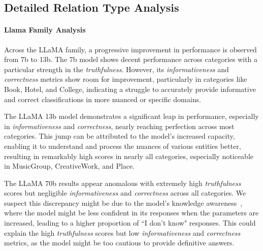 \subsection{Detailed Relation Type Analysis}
\label{app:relation_type_study}



\paragraph{Llama Family Analysis}
Across the LLaMA family, a progressive improvement in performance is observed from  7b to 13b. The 7b model shows decent performance across categories with a particular strength in the \textit{truthfulness}. However, its \textit{informativeness} and \textit{correctness} metrics show room for improvement, particularly in categories like Book, Hotel, and College, indicating a struggle to accurately provide informative and correct classifications in more nuanced or specific domains.

The LLaMA 13b model demonstrates a significant leap in performance, especially in \textit{informativeness} and \textit{correctness}, nearly reaching perfection across most categories. This jump can be attributed to the model's increased capacity, enabling it to understand and process the nuances of various entities better, resulting in remarkably high scores in nearly all categories, especially noticeable in MusicGroup, CreativeWork, and Place.

The LLaMA 70b results appear anomalous with extremely high \textit{truthfulness} scores but negligible \textit{informativeness} and \textit{correctness} across all categories. We suspect this discrepancy might be due to the model's knowledge awareness~\cite{ren2023investigating}, where the model might be less confident in its responses when the parameters are increased, leading to a higher proportion of ``I don't know" responses. This could explain the high \textit{truthfulness} scores but low \textit{informativeness} and \textit{correctness} metrics, as the model might be too cautious to provide definitive answers.

